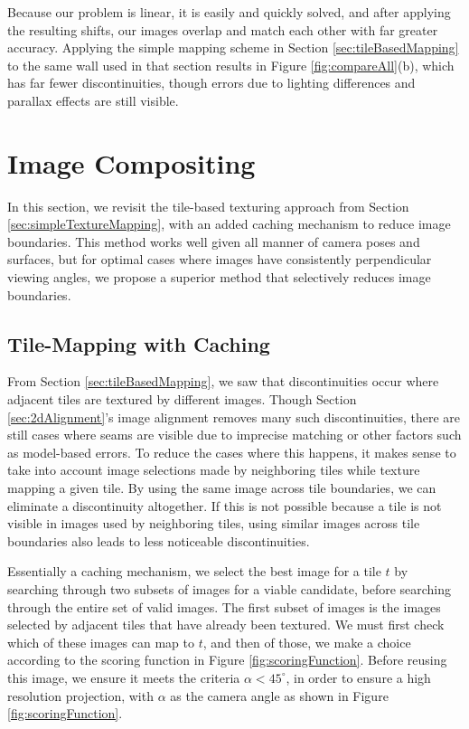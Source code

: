 \documentclass[]{spie}  %
\begin{document}
Because our problem is linear, it is easily and quickly solved, and
after applying the resulting shifts, our images overlap and match each
other with far greater accuracy. Applying the simple mapping scheme in
Section \ref{sec:tileBasedMapping} to the same wall used in that
section results in Figure \ref{fig:compareAll}(b), which has far fewer
discontinuities, though errors due to lighting differences and
parallax effects are still visible.

\section{Image Compositing}
\label{sec:imageCompositing}
In this section, we revisit the tile-based texturing approach from
Section \ref{sec:simpleTextureMapping}, with an added caching
mechanism to reduce image boundaries. This method works well given all
manner of camera poses and surfaces, but for optimal cases where
images have consistently perpendicular viewing angles, we propose a
superior method that selectively reduces image boundaries.

\subsection{Tile-Mapping with Caching}
\label{sec:mappingWithCaching}
From Section \ref{sec:tileBasedMapping}, we saw that discontinuities
occur where adjacent tiles are textured by different images. Though
Section \ref{sec:2dAlignment}'s image alignment removes many such
discontinuities, there are still cases where seams are visible due to
imprecise matching or other factors such as model-based errors. To
reduce the cases where this happens, it makes sense to take into
account image selections made by neighboring tiles while texture
mapping a given tile. By using the same image across tile boundaries,
we can eliminate a discontinuity altogether. If this is not possible
because a tile is not visible in images used by neighboring tiles,
using similar images across tile boundaries also leads to less
noticeable discontinuities.

Essentially a caching mechanism, we select the best image for a tile
$t$ by searching through two subsets of images for a viable candidate,
before searching through the entire set of valid images. The first
subset of images is the images selected by adjacent tiles that have
already been textured. We must first check which of these images can
map to $t$, and then of those, we make a choice according to the
scoring function in Figure \ref{fig:scoringFunction}. Before reusing
this image, we ensure it meets the criteria $\alpha < 45^\circ$, in
order to ensure a high resolution projection, with $\alpha$ as the
camera angle as shown in Figure \ref{fig:scoringFunction}.
\end{document}
